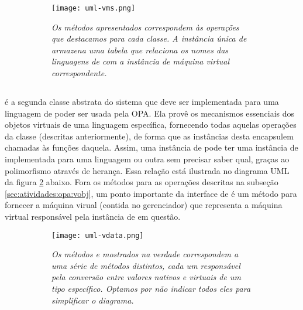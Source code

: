   \begin{figure}[ht]
    \centering
    \caption{}
    \begin{subfigure}{.8\textwidth}
      \begin{center}
        \texttt{[image: uml-vms.png]}
        \vspace{1em}

        \textit{
          Os métodos apresentados correspondem às operações que destacamos para
          cada classe. A instância única de \SMgr{} armazena uma tabela que
          relaciona os nomes das linguagens de \script{} com a instância de
          máquina virtual correspondente.
        }
      \end{center}
    \end{subfigure}
    \label{fig:uml-vms}
  \end{figure}
  
  \subsection{\VData{}}
  \label{sec:atividades:opa:vdata}
  \VData{} é a segunda classe abstrata do sistema que deve ser implementada para uma linguagem
  de \script{} poder ser usada pela OPA. Ela provê os mecanismos essenciais dos objetos virtuais
  de uma linguagem específica, fornecendo todas aquelas
  operações da classe \VObj{} (descritas anteriormente), de forma que as instâncias desta
  encapsulem chamadas às funções daquela. Assim, uma instância
  de \VObj{} pode ter uma instância de \VData{} implementada para uma linguagem 
  ou outra sem precisar saber qual, graças ao polimorfismo através de herança. Essa relação
  está ilustrada no diagrama UML da figura \ref{fig:uml-vdata} abaixo. Fora os métodos para as
  operações descritas na subseção \ref{sec:atividades:opa:vobj}, um ponto importante da
  interface de \VData{} é um método para fornecer a máquina virual (contida no gerenciador)
  que representa a máquina virtual responsável pela instância de \VData{} em questão.

  \begin{figure}[ht]
    \centering
    \caption{}
    \begin{subfigure}{.8\textwidth}
      \begin{center}
        \texttt{[image: uml-vdata.png]}
        \vspace{1em}

        \textit{
          Os métodos  e  mostrados na verdade correspondem
          a uma série de métodos distintos, cada um responsável pela conversão entre
          valores nativos e virtuais de um tipo específico. Optamos por não indicar
          todos eles para simplificar o diagrama.
        }
      \end{center}
    \end{subfigure}
    \label{fig:uml-vdata}
  \end{figure}
  
